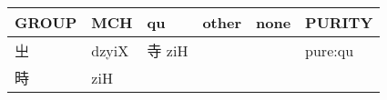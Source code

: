 \documentclass[14pt,a4paper]{scrartcl}
\begin{document}
\begin{longtable}[c]{@{}llllll@{}}
\toprule
\begin{minipage}[b]{0.14\columnwidth}\raggedright\strut
GROUP
\strut\end{minipage} &
\begin{minipage}[b]{0.14\columnwidth}\raggedright\strut
MCH
\strut\end{minipage} &
\begin{minipage}[b]{0.14\columnwidth}\raggedright\strut
qu
\strut\end{minipage} &
\begin{minipage}[b]{0.14\columnwidth}\raggedright\strut
other
\strut\end{minipage} &
\begin{minipage}[b]{0.14\columnwidth}\raggedright\strut
none
\strut\end{minipage} &
\begin{minipage}[b]{0.14\columnwidth}\raggedright\strut
PURITY
\strut\end{minipage}\tabularnewline
\midrule
\endhead
\begin{minipage}[t]{0.14\columnwidth}\raggedright\strut
㞢
\strut\end{minipage} &
\begin{minipage}[t]{0.14\columnwidth}\raggedright\strut
dzyiX
\strut\end{minipage} &
\begin{minipage}[t]{0.14\columnwidth}\raggedright\strut
寺 ziH
\strut\end{minipage} &
\begin{minipage}[t]{0.14\columnwidth}\raggedright\strut
\strut\end{minipage} &
\begin{minipage}[t]{0.14\columnwidth}\raggedright\strut
\strut\end{minipage} &
\begin{minipage}[t]{0.14\columnwidth}\raggedright\strut
pure:qu
\strut\end{minipage}\tabularnewline
\begin{minipage}[t]{0.14\columnwidth}\raggedright\strut
時
\strut\end{minipage} &
\begin{minipage}[t]{0.14\columnwidth}\raggedright\strut
ziH
\strut\end{minipage} &
\begin{minipage}[t]{0.14\columnwidth}\raggedright\strut
\strut\end{minipage} &
\begin{minipage}[t]{0.14\columnwidth}\raggedright\strut

\end{minipage}
\end{longtable}
\end{document}
